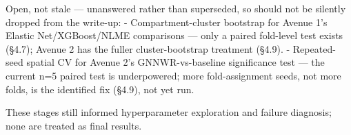Open, not stale — unanswered rather than superseded, so should not be silently dropped from the write-up:
- Compartment-cluster bootstrap for Avenue 1's Elastic Net/XGBoost/NLME comparisons — only a paired fold-level test exists (§4.7); Avenue 2 has the fuller cluster-bootstrap treatment (§4.9).
- Repeated-seed spatial CV for Avenue 2's GNNWR-vs-baseline significance test — the current n=5 paired test is underpowered; more fold-assignment seeds, not more folds, is the identified fix (§4.9), not yet run.

These stages still informed hyperparameter exploration and failure diagnosis; none are treated as final results.

